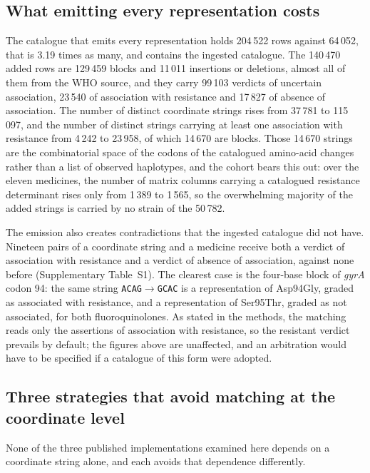 \documentclass[11pt]{article}
\begin{document}
\subsection{What emitting every representation costs}\label{sec:emission}
The catalogue that emits every representation holds 204\,522 rows against 64\,052, that is
3.19 times as many, and contains the ingested catalogue. The 140\,470 added rows are
129\,459 blocks and 11\,011 insertions or deletions, almost all of them from the WHO source,
and they carry 99\,103 verdicts of uncertain association, 23\,540 of association with
resistance and 17\,827 of absence of association. The number of distinct coordinate strings
rises from 37\,781 to 115\,097, and the number of distinct strings carrying at least one
association with resistance from 4\,242 to 23\,958, of which 14\,670 are blocks. Those
14\,670 strings are the combinatorial space of the codons of the catalogued amino-acid
changes rather than a list of observed haplotypes, and the cohort bears this out: over the
eleven medicines, the number of matrix columns carrying a catalogued resistance determinant
rises only from 1\,389 to 1\,565, so the overwhelming majority of the added strings is
carried by no strain of the 50\,782.

The emission also creates contradictions that the ingested catalogue did not have. Nineteen
pairs of a coordinate string and a medicine receive both a verdict of association with
resistance and a verdict of absence of association, against none before (Supplementary
Table~S1). The clearest case is the four-base block of \textit{gyrA} codon 94: the same string
\texttt{ACAG}$\rightarrow$\texttt{GCAC} is a representation of Asp94Gly, graded as associated
with resistance, and a representation of Ser95Thr, graded as not associated, for both
fluoroquinolones. As stated in the methods, the matching reads only the assertions of
association with resistance, so the resistant verdict prevails by default; the figures above
are unaffected, and an arbitration would have to be specified if a catalogue of this form were
adopted.

\subsection{Three strategies that avoid matching at the coordinate level}\label{sec:outils}
None of the three published implementations examined here depends on a coordinate string
alone, and each avoids that dependence differently.
\end{document}
